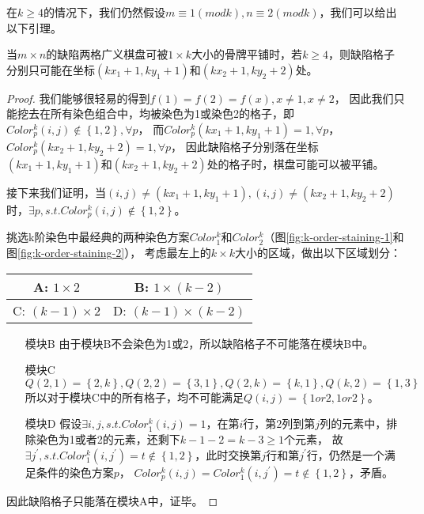 在$k \ge 4$的情况下，我们仍然假设$m \equiv 1 (mod k), n \equiv 2 (mod k)$，我们可以给出以下引理。
\begin{theorem}
	\label{basic-theorem-3}
	当$m \times n$的缺陷两格广义棋盘可被$1 \times k$大小的骨牌平铺时，若$k \ge 4$，则缺陷格子分别只可能在坐标$(kx_1 + 1, ky_1 + 1)$和$(kx_2 + 1, ky_2 + 2)$处。
\end{theorem}
\begin{proof}
	我们能够很轻易的得到$f(1) = f(2) = f(x), x \neq 1, x \neq 2$，
	因此我们只能挖去在所有染色组合中，均被染色为1或染色2的格子，即$Color^k_p(i, j) \notin \left\{1, 2\right\},  \forall p$，
	而$Color^k_p(kx_1 + 1, ky_1 + 1) = 1, \forall p$，$Color^k_p(kx_2 + 1, ky_2 + 2) = 1, \forall p$，
	因此缺陷格子分别落在坐标$(kx_1 + 1, ky_1 + 1)$和$(kx_2 + 1, ky_2 + 2)$处的格子时，棋盘可能可以被平铺。

	接下来我们证明，当$(i, j) \neq (kx_1 + 1, ky_1 + 1), (i, j) \neq (kx_2 + 1, ky_2 + 2)$时，$\exists p, s.t. Color^k_p(i, j) \notin \left\{1, 2\right\}$。

	挑选k阶染色中最经典的两种染色方案$Color^k_1$和$Color^k_2$（图\ref{fig:k-order-staining-1}和图\ref{fig:k-order-staining-2}），
	考虑最左上的$k \times k$大小的区域，做出以下区域划分：

	\begin{table}[ht]
		\centering
		\begin{tabular}{|c|c|}
			\hline
			A: $1 \times 2$       & B: $1  \times (k - 2)$     \\
			\hline
			C: $(k - 1) \times 2$ & D: $(k - 1)\times (k - 2)$ \\
			\hline
		\end{tabular}
	\end{table}

	\begin{itemize}
		\item[模块B] 由于模块B不会染色为1或2，所以缺陷格子不可能落在模块B中。
		\item[模块C] $Q(2, 1) = \left\{2, k\right\}, Q(2, 2) = \left\{3, 1\right\}, Q(2, k) = \left\{k, 1\right\}, Q(k,2) = \left\{1, 3\right\}$
			所以对于模块C中的所有格子，均不可能满足$Q(i, j) = \left\{1 or 2, 1 or 2\right\}$。
		\item[模块D] 假设$\exists i, j, s.t. Color^k_1(i, j) = 1$，在第$i$行，第$2$列到第$j$列的元素中，排除染色为1或者2的元素，还剩下$k - 1 - 2 = k - 3\ge 1$个元素，
			故$\exists j^{'}, s.t. Color^k_1(i, j^{'}) = t \notin \left\{1, 2\right\}$，此时交换第$j$行和第$j^{'}$行，仍然是一个满足条件的染色方案$p$，
			$Color^k_p(i, j) = Color^k_1(i, j^{'}) = t \notin \left\{1, 2\right\}$，矛盾。
	\end{itemize}
	因此缺陷格子只能落在模块A中，证毕。
\end{proof}

